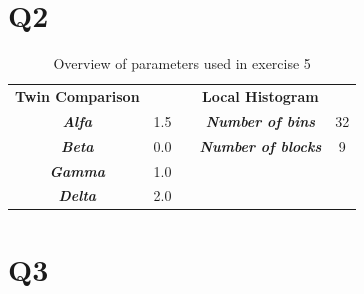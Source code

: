 \begin{appendices}


\section{Q2}\label{app:q2}
\begin{table}[h]
\centering
\caption{Overview of parameters used in exercise 5}
\label{tab:twinparameters}
\begin{tabular}{|c|clcc}
\cline{1-1} \cline{4-4}
\multicolumn{1}{|l|}{\textbf{Twin Comparison}} & \multicolumn{1}{l}{\textbf{}} & \multicolumn{1}{l|}{} & \multicolumn{1}{c|}{\textbf{Local Histogram}}           &                         \\ \cline{1-2} \cline{4-5} 
\textit{\textbf{Alfa}}                         & \multicolumn{1}{c|}{1.5}      & \multicolumn{1}{l|}{} & \multicolumn{1}{c|}{\textit{\textbf{Number of bins}}}   & \multicolumn{1}{c|}{32} \\ \cline{1-2} \cline{4-5} 
\textit{\textbf{Beta}}                         & \multicolumn{1}{c|}{0.0}      & \multicolumn{1}{l|}{} & \multicolumn{1}{c|}{\textit{\textbf{Number of blocks}}} & \multicolumn{1}{c|}{9}  \\ \cline{1-2} \cline{4-5} 
\textit{\textbf{Gamma}}                        & \multicolumn{1}{c|}{1.0}      &                       & \multicolumn{1}{l}{}                                    & \multicolumn{1}{l}{}    \\ \cline{1-2}
\textit{\textbf{Delta}}                        & \multicolumn{1}{c|}{2.0}      &                       & \multicolumn{1}{l}{}                                    & \multicolumn{1}{l}{}    \\ \cline{1-2}
\end{tabular}
\end{table}

\section{Q3}\label{app:q3}

\end{appendices}
